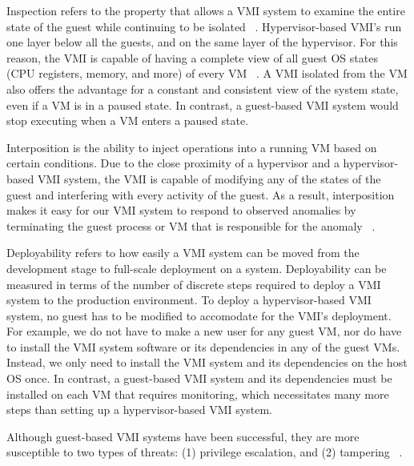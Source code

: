 \documentclass{report}
\begin{document}
\begin{spacing}{1.5}
{\large
\noindent Inspection refers to the property that allows a VMI system to examine the entire state of the guest while continuing to be isolated ~\cite{pfoh2009formal}. Hypervisor-based VMI's run one layer below all the guests, and on the same layer of the hypervisor. For this reason, the VMI is capable of having a complete view of all guest OS states (CPU registers, memory, and more) of every VM ~\cite{hebbal2015virtual}. A VMI isolated from the VM also offers the advantage for a constant and consistent view of the system state, even if a VM is in a paused state. In contrast, a guest-based VMI system would stop executing when a VM enters a paused state.
\newline
}


{\large
\noindent Interposition is the ability to inject operations into a running VM based on certain conditions. Due to the close proximity of a hypervisor and a hypervisor-based VMI system, the VMI is capable of modifying any of the states of the guest and interfering with every activity of the guest. As a result, interposition makes it easy for our VMI system to respond to observed anomalies by terminating the guest process or VM that is responsible for the anomaly ~\cite{hebbal2015virtual}.
\newline
}


{\large
\noindent Deployability refers to how easily a VMI system can be moved from the development stage to full-scale deployment on a system. Deployability can be measured in terms of the number of discrete steps required to deploy a VMI system to the production environment. To deploy a hypervisor-based VMI system, no guest has to be modified to accomodate for the VMI's deployment. For example, we do not have to make a new user for any guest VM, nor do have to install the VMI system software or its dependencies in any of the guest VMs. Instead, we only need to install the VMI system and its dependencies on the host OS once. In contrast, a guest-based VMI system and its dependencies must be installed on each VM that requires monitoring, which necessitates many more steps than setting up a hypervisor-based VMI system.
\newline
}


{\large
\noindent Although guest-based VMI systems have been successful, they are more susceptible to two types of threats: (1) privilege escalation, and (2) tampering ~\cite{pfoh2009formal}. 
\newline
}



\end{spacing}
\end{document}
